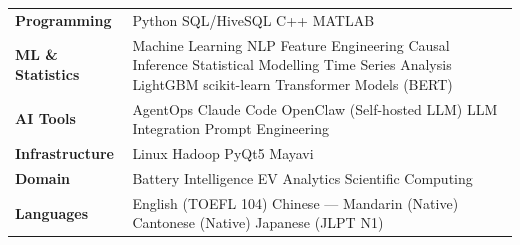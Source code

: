 \documentclass[a4paper,9pt]{article}
\begin{document}
\begin{tabular}{@{}p{3.0cm}p{12.5cm}@{}}
\textbf{Programming}      & Python \textperiodcentered{} SQL/HiveSQL \textperiodcentered{} C++ \textperiodcentered{} MATLAB \\[1pt]
\textbf{ML \& Statistics} & Machine Learning \textperiodcentered{} NLP \textperiodcentered{} Feature Engineering \textperiodcentered{} Causal Inference \textperiodcentered{} Statistical Modelling \textperiodcentered{} Time Series Analysis \textperiodcentered{} LightGBM \textperiodcentered{} scikit-learn \textperiodcentered{} Transformer Models (BERT) \\[1pt]
\textbf{AI Tools}         & AgentOps \textperiodcentered{} Claude Code \textperiodcentered{} OpenClaw (Self-hosted LLM) \textperiodcentered{} LLM Integration \textperiodcentered{} Prompt Engineering \\[1pt]
\textbf{Infrastructure}   & Linux \textperiodcentered{} Hadoop \textperiodcentered{} PyQt5 \textperiodcentered{} Mayavi \\[1pt]
\textbf{Domain}           & Battery Intelligence \textperiodcentered{} EV Analytics \textperiodcentered{} Scientific Computing \\[1pt]
\textbf{Languages}        & English (TOEFL 104) \textperiodcentered{} Chinese --- Mandarin (Native) \textperiodcentered{} Cantonese (Native) \textperiodcentered{} Japanese (JLPT N1) \\
\end{tabular}
\end{document}
